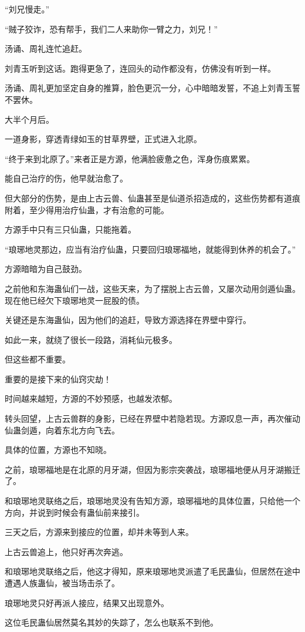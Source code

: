 \begin{this_body}
“刘兄慢走。”

“贼子狡诈，恐有帮手，我们二人来助你一臂之力，刘兄！”

汤诵、周礼连忙追赶。

刘青玉听到这话。跑得更急了，连回头的动作都没有，仿佛没有听到一样。

汤诵、周礼更加坚定自身的推算，脸色更沉一分，心中暗暗发誓，不追上刘青玉誓不罢休。

大半个月后。

一道身影，穿透青绿如玉的甘草界壁，正式进入北原。

“终于来到北原了。”来者正是方源，他满脸疲惫之色，浑身伤痕累累。

能自己治疗的伤，他早就治愈了。

但大部分的伤势，是由上古云兽、仙蛊甚至是仙道杀招造成的，这些伤势都有道痕附着，至少得用治疗仙蛊，才有治愈的可能。

方源手中只有三只仙蛊，只能拖着。

“琅琊地灵那边，应当有治疗仙蛊，只要回归琅琊福地，就能得到休养的机会了。”

方源暗暗为自己鼓劲。

之前他和东海蛊仙们一战，这些天来，为了摆脱上古云兽，又屡次动用剑遁仙蛊。现在他已经欠下琅琊地灵一屁股的债。

关键还是东海蛊仙，因为他们的追赶，导致方源选择在界壁中穿行。

如此一来，就绕了很长一段路，消耗仙元极多。

但这些都不重要。

重要的是接下来的仙窍灾劫！

时间越来越短，方源的不妙预感，也越发浓郁。

转头回望，上古云兽群的身影，已经在界壁中若隐若现。方源叹息一声，再次催动仙蛊剑遁，向着东北方向飞去。

具体的位置，方源也不知晓。

之前，琅琊福地是在北原的月牙湖，但因为影宗突袭战，琅琊福地便从月牙湖搬迁了。

和琅琊地灵联络之后，琅琊地灵没有告知方源，琅琊福地的具体位置，只给他一个方向，并说到时候会有蛊仙前来接引。

三天之后，方源来到接应的位置，却并未等到人来。

上古云兽追上，他只好再次奔逃。

和琅琊地灵联络之后，他这才得知，原来琅琊地灵派遣了毛民蛊仙，但居然在途中遭遇人族蛊仙，被当场击杀了。

琅琊地灵只好再派人接应，结果又出现意外。

这位毛民蛊仙居然莫名其妙的失踪了，怎么也联系不到他。


\end{this_body}
